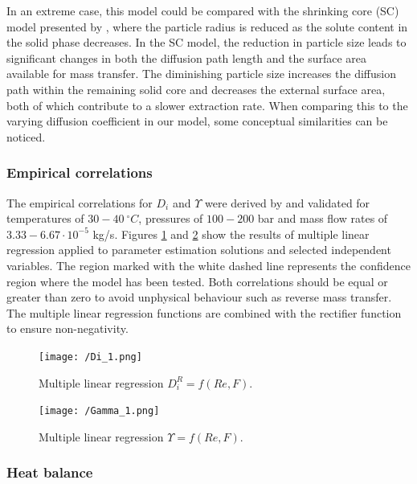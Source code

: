\documentclass[a4paper,fleqn]{cas-dc}
\begin{document}
		In an extreme case, this model could be compared with the shrinking core (SC) model presented by \citet{Goto1996}, where the particle radius is reduced as the solute content in the solid phase decreases. In the SC model, the reduction in particle size leads to significant changes in both the diffusion path length and the surface area available for mass transfer. The diminishing particle size increases the diffusion path within the remaining solid core and decreases the external surface area, both of which contribute to a slower extraction rate. When comparing this to the varying diffusion coefficient in our model, some conceptual similarities can be noticed.
		
		\subsubsection{Empirical correlations}
		
		The empirical correlations for $D_i$ and $\Upsilon$ were derived by \citet{Sliczniuk2024} and validated for temperatures of $30 - 40~^\circ C$, pressures of $100 - 200$ bar and mass flow rates of $3.33-6.67 \cdot 10^{-5}$ kg/s. Figures \ref{fig:Correlation_Di} and \ref{fig:Correlation_Gamma} show the results of multiple linear regression applied to parameter estimation solutions and selected independent variables. The region marked with the white dashed line represents the confidence region where the model has been tested. Both correlations should be equal or greater than zero to avoid unphysical behaviour such as reverse mass transfer. The multiple linear regression functions are combined with the rectifier function to ensure non-negativity.
		
		\begin{figure}[!ht]
			\centering
			\texttt{[image: /Di\_1.png]}
			\caption{Multiple linear regression $D_i^R = f(Re, F)$.}
			\label{fig:Correlation_Di}
		\end{figure}
		
		\begin{figure}[!ht]
			\centering
			\texttt{[image: /Gamma\_1.png]}
			\caption{Multiple linear regression $\Upsilon = f(Re, F)$.}
			\label{fig:Correlation_Gamma}
		\end{figure}
		
		\subsubsection{Heat balance} \label{CH: heat_balance}
		
\end{document}
